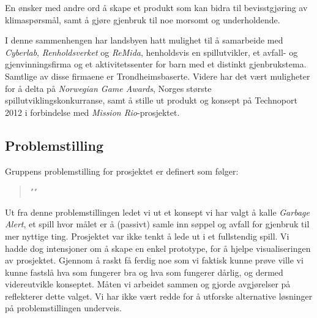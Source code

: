 En ønsker med andre ord å skape et
produkt som kan bidra til bevisstgjøring av klimaspørsmål, samt å gjøre
gjenbruk til noe morsomt og underholdende.

I denne sammenhengen har landsbyen hatt mulighet til å samarbeide med
\emph{Cyberlab}, \emph{Renholdsverket} og \emph{ReMida}, henholdsvis en
spillutvikler, et avfall- og gjenvinningsfirma og et aktivitetssenter
for barn med et distinkt gjenbrukstema. Samtlige av disse firmaene er
Trondheimsbaserte. Videre har det vært muligheter for å delta på
\emph{Norwegian Game Awards}, Norges største spillutviklingskonkurranse,
samt å stille ut produkt og konsept på Technoport 2012 i forbindelse med
\emph{Mission Rio}-prosjektet.

\subsection{Problemstilling} Gruppens problemstilling for prosjektet er
definert som følger:
\begin{quotation}
\emph{""}
\end{quotation}
 Ut fra denne
problemstillingen ledet vi ut et konsept vi har valgt å kalle
\emph{Garbage Alert}, et spill hvor målet er å (passivt) samle inn
søppel og avfall for gjenbruk til mer nyttige ting. Prosjektet var ikke
tenkt å lede ut i et fullstendig spill. Vi hadde dog intensjoner om å
skape en enkel prototype, for å hjelpe visualiseringen av prosjektet.
Gjennom å raskt få ferdig noe som vi faktisk kunne prøve ville vi kunne
fastslå hva som fungerer bra og hva som fungerer dårlig, og dermed
videreutvikle konseptet. Måten vi arbeidet sammen og gjorde avgjørelser på
reflekterer dette valget. Vi har ikke vært redde for å utforske
alternative løsninger på problemstillingen underveis.
